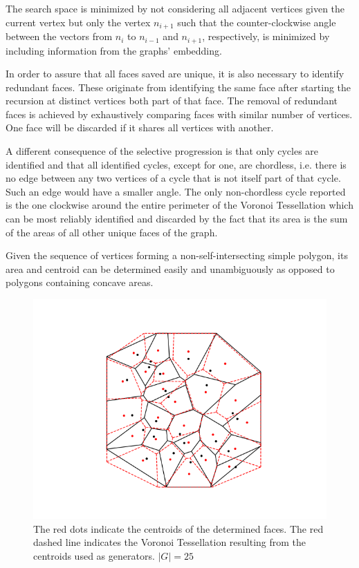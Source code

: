 \documentclass[a4paper]{article}
\begin{document}
The search space is minimized by not considering all adjacent vertices given the current vertex but only the
vertex \(n_{i+1}\) such that the counter-clockwise angle between the vectors from \(n_i\) to \(n_{i-1}\) and \(n_{i+1}\),
respectively, is minimized by including information from the graphs' embedding.

In order to assure that all faces saved are unique, it is also necessary to identify redundant faces.
These originate from identifying the same face after starting the recursion at distinct vertices both part of
that face. The removal of redundant faces is achieved by exhaustively comparing faces with similar number of vertices.
One face will be discarded if it shares all vertices with another.

A different consequence of the selective progression is that only cycles are identified
and that all identified cycles, except for one, are chordless, i.e.
there is no edge between any two vertices of a cycle that is not itself part of that cycle.
Such an edge would have a smaller angle. The only non-chordless cycle reported is the one clockwise around the entire
perimeter of the Voronoi Tessellation which can be most reliably identified and discarded by the fact
that its area is the sum of the areas of all other unique faces of the graph.

Given the sequence of vertices forming a non-self-intersecting simple polygon, its area and centroid can be determined
easily and unambiguously as opposed to polygons containing concave areas.

\begin{figure}[H]
	\includegraphics[width=\textwidth]{face_centroids.png}
	\caption{The red dots indicate the centroids of the determined faces. The red dashed line indicates the
		Voronoi Tessellation resulting from the centroids used as generators. \(|G| = 25\)}
\end{figure}
\end{document}
